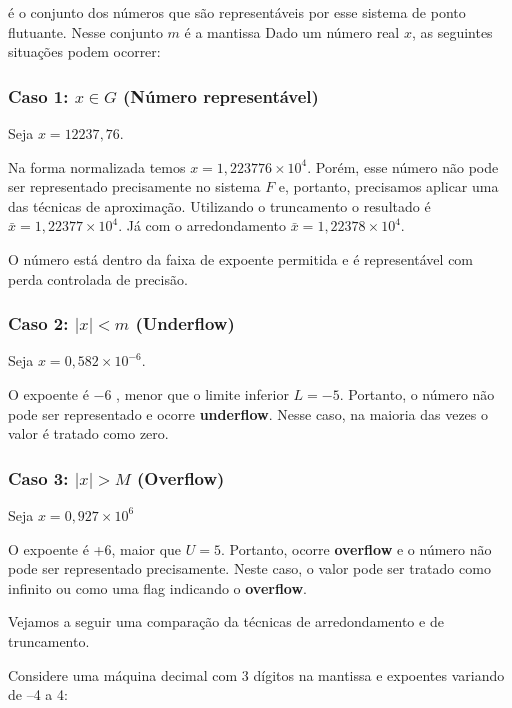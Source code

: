 é o conjunto dos números que são representáveis por esse sistema de ponto flutuante. Nesse conjunto \( m \) é a mantissa %
Dado um número real $x$, as seguintes situações podem ocorrer:

\subsubsection{Caso 1: \( x \in G \) (Número representável)}
Seja $x = 12237,76$. 

Na forma normalizada temos \(x = 1,223776 \times10^4\).
Porém, esse número não pode ser representado precisamente no sistema $F$ e, portanto, precisamos aplicar uma das técnicas de aproximação. Utilizando o truncamento o resultado é \( \bar{x} = 1{,}22377 \times 10^4 \). Já com o arredondamento \( \bar{x} = 1{,}22378 \times 10^4 \).

O número está dentro da faixa de expoente permitida e é representável com perda controlada de precisão.

\subsubsection*{Caso 2: \( |x| < m \) (Underflow)}

Seja \( x = 0{,}582 \times 10^{-6} \).

O expoente é  \(-6\) , menor que o limite inferior $L = -5$. Portanto, o número não pode ser representado e ocorre \textbf{underflow}. Nesse caso, na maioria das vezes o valor é tratado como zero.

\subsubsection*{Caso 3: \( |x| > M \) (Overflow)}

Seja \( x = 0{,}927 \times 10^6 \)

O expoente é +6, maior que $U = 5$. 
Portanto, ocorre \textbf{overflow} e o número não pode ser representado precisamente. Neste caso, o valor pode ser tratado como infinito ou como uma flag indicando o \textbf{overflow}.


Vejamos a seguir uma comparação da técnicas de arredondamento e de truncamento.

Considere uma máquina decimal com 3 dígitos na mantissa e expoentes variando de –4 a 4:

